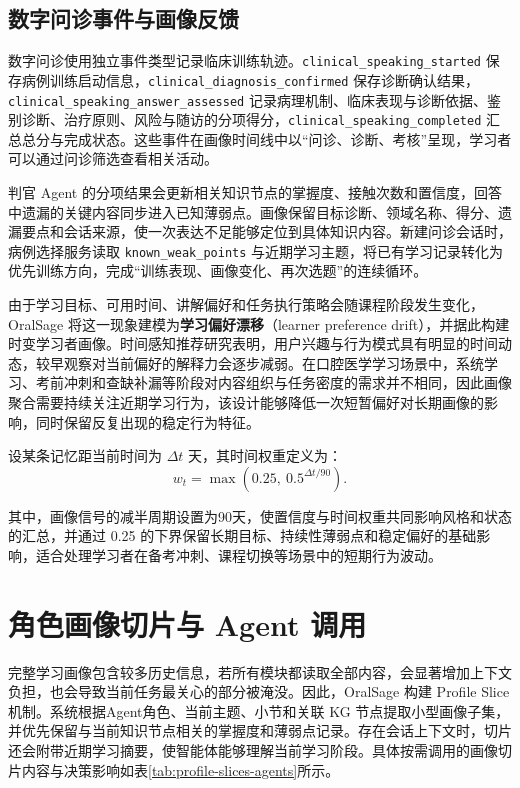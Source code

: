 \subsection{数字问诊事件与画像反馈}

数字问诊使用独立事件类型记录临床训练轨迹。\texttt{clinical\_speaking\_started} 保存病例训练启动信息，\texttt{clinical\_diagnosis\_confirmed} 保存诊断确认结果，\texttt{clinical\_speaking\_answer\_assessed} 记录病理机制、临床表现与诊断依据、鉴别诊断、治疗原则、风险与随访的分项得分，\texttt{clinical\_speaking\_completed} 汇总总分与完成状态。这些事件在画像时间线中以“问诊、诊断、考核”呈现，学习者可以通过问诊筛选查看相关活动。

判官 Agent 的分项结果会更新相关知识节点的掌握度、接触次数和置信度，回答中遗漏的关键内容同步进入已知薄弱点。画像保留目标诊断、领域名称、得分、遗漏要点和会话来源，使一次表达不足能够定位到具体知识内容。新建问诊会话时，病例选择服务读取 \texttt{known\_weak\_points} 与近期学习主题，将已有学习记录转化为优先训练方向，完成“训练表现、画像变化、再次选题”的连续循环。

由于学习目标、可用时间、讲解偏好和任务执行策略会随课程阶段发生变化，OralSage 将这一现象建模为\textbf{学习偏好漂移}（learner preference drift），并据此构建时变学习者画像。时间感知推荐研究表明，用户兴趣与行为模式具有明显的时间动态，较早观察对当前偏好的解释力会逐步减弱\cite{koren2009temporal}。在口腔医学学习场景中，系统学习、考前冲刺和查缺补漏等阶段对内容组织与任务密度的需求并不相同，因此画像聚合需要持续关注近期学习行为，该设计能够降低一次短暂偏好对长期画像的影响，同时保留反复出现的稳定行为特征。

设某条记忆距当前时间为 $\Delta t$ 天，其时间权重定义为：
\begin{equation}
  w_t=\max\left(0.25,\ 0.5^{\Delta t/90}\right).
  \label{eq:profile-recency}
\end{equation}

其中，画像信号的减半周期设置为90天，使置信度与时间权重共同影响风格和状态的汇总，并通过 0.25 的下界保留长期目标、持续性薄弱点和稳定偏好的基础影响，适合处理学习者在备考冲刺、课程切换等场景中的短期行为波动。

\section{角色画像切片与 Agent 调用}

完整学习画像包含较多历史信息，若所有模块都读取全部内容，会显著增加上下文负担，也会导致当前任务最关心的部分被淹没。因此，OralSage 构建 Profile Slice 机制。系统根据Agent角色、当前主题、小节和关联 KG 节点提取小型画像子集，并优先保留与当前知识节点相关的掌握度和薄弱点记录。存在会话上下文时，切片还会附带近期学习摘要，使智能体能够理解当前学习阶段。具体按需调用的画像切片内容与决策影响如表\ref{tab:profile-slices-agents}所示。

